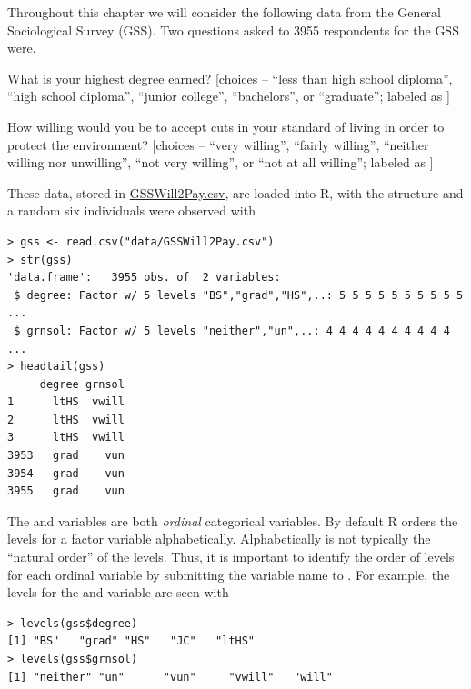 \documentclass[10pt,openany]{book}\usepackage[]{graphicx}\usepackage[]{color}
\makeatletter
\newenvironment{kframe}{%
 \def\at@end@of@kframe{}%
 \ifinner\ifhmode%
  \def\at@end@of@kframe{\end{minipage}}%
  \begin{minipage}{\columnwidth}%
 \fi\fi%
 \def\FrameCommand##1{\hskip\@totalleftmargin \hskip-\fboxsep
 \colorbox{shadecolor}{##1}\hskip-\fboxsep
     \hskip-\linewidth \hskip-\@totalleftmargin \hskip\columnwidth}%
 \MakeFramed {\advance\hsize-\width
   \@totalleftmargin\z@ \linewidth\hsize
   \@setminipage}}%
 {\par\unskip\endMakeFramed%
 \at@end@of@kframe}
\newenvironment{knitrout}{}{} %
\makeatother
\begin{document}
Throughout this chapter we will consider the following data from the General Sociological Survey (GSS).  Two questions asked to 3955 respondents for the GSS were,
\begin{Itemize}
  \item What is your highest degree earned? [choices -- ``less than high school diploma'', ``high school diploma'', ``junior college'', ``bachelors'', or ``graduate''; labeled as ]
  \item How willing would you be to accept cuts in your standard of living in order to protect the environment? [choices -- ``very willing'', ``fairly willing'', ``neither willing nor unwilling'', ``not very willing'', or ``not at all willing''; labeled as ]
\end{Itemize}
These data, stored in \href{https://raw.githubusercontent.com/droglenc/NCData/master/GSSWill2Pay.csv}{GSSWill2Pay.csv}, are loaded into R, with the structure and a random six individuals were observed with
\begin{knitrout}
\color{fgcolor}\begin{kframe}
\begin{verbatim}
> gss <- read.csv("data/GSSWill2Pay.csv")
> str(gss)
'data.frame':	3955 obs. of  2 variables:
 $ degree: Factor w/ 5 levels "BS","grad","HS",..: 5 5 5 5 5 5 5 5 5 5 ...
 $ grnsol: Factor w/ 5 levels "neither","un",..: 4 4 4 4 4 4 4 4 4 4 ...
> headtail(gss)
     degree grnsol
1      ltHS  vwill
2      ltHS  vwill
3      ltHS  vwill
3953   grad    vun
3954   grad    vun
3955   grad    vun
\end{verbatim}
\end{kframe}
\end{knitrout}
The  and  variables are both \emph{ordinal} categorical variables.  By default R orders the levels for a factor variable alphabetically.  Alphabetically is not typically the ``natural order'' of the levels.  Thus, it is important to identify the order of levels for each ordinal variable by submitting the variable name to .  For example, the levels for the  and  variable are seen with
\begin{knitrout}
\color{fgcolor}\begin{kframe}
\begin{verbatim}
> levels(gss$degree)
[1] "BS"   "grad" "HS"   "JC"   "ltHS"
> levels(gss$grnsol)
[1] "neither" "un"      "vun"     "vwill"   "will"   
\end{verbatim}
\end{kframe}
\end{knitrout}
\end{document}
